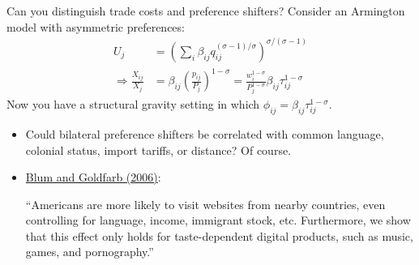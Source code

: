 \documentclass[10pt,notes=hide,aspectratio=169]{beamer}
\begin{document}
\begin{frame}{Can you distinguish trade costs and preference shifters?}
Consider an Armington model with asymmetric preferences:
\begin{align*}
	U_j &= \left(\sum_{i} \beta_{ij} q_{ij}^{(\sigma-1)/\sigma}\right)^{\sigma/(\sigma-1)}
	\\
	\Rightarrow
	\frac{X_{ij}}{X_j} &= \beta_{ij} \left(\frac{p_{ij}}{P_j}\right)^{1-\sigma} 
	=
	\frac{w_i^{1-\sigma}}{P_j^{1-\sigma}}\beta_{ij}\tau_{ij}^{1-\sigma}
\end{align*}
Now you have a structural gravity setting in which $\phi_{ij}=\beta_{ij}\tau_{ij}^{1-\sigma}$.
\begin{itemize}
	\item Could bilateral preference shifters be correlated with common language, colonial status, import tariffs, or distance? Of course. 
	\item \href{https://www.sciencedirect.com/science/article/pii/S0022199606000225}{Blum and Goldfarb (2006)}: {\small ``Americans are more likely to visit websites from nearby countries, even controlling for language, income, immigrant stock, etc. Furthermore, we show that this effect only holds for taste-dependent digital products, such as music, games, and pornography.''\par}
\end{itemize}
\end{frame}
\end{document}
